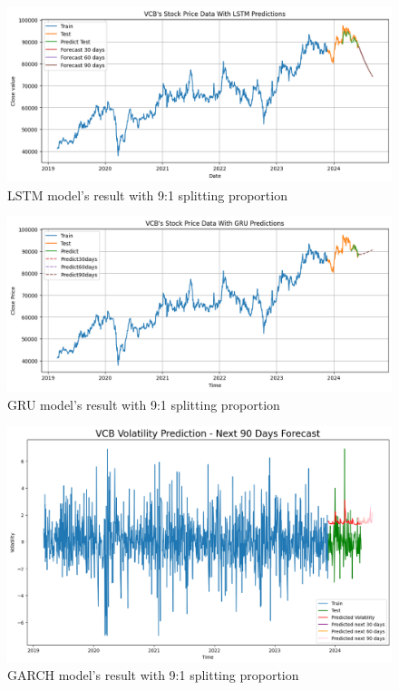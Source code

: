 \documentclass{ieeeojies}
\begin{document}
\begin{figure}[H]
  \centering
  \begin{minipage}{0.8\linewidth}
    \centering
    \includegraphics[width=\linewidth]{bibliography/VCB-LSTM-9-1.png}
    \caption{LSTM model's result with 9:1 splitting proportion}
    \label{fig9}
  \end{minipage}
\end{figure}
\begin{figure}[H]
  \centering
  \begin{minipage}{0.8\linewidth}
    \centering
    \includegraphics[width=\linewidth]{bibliography/VCB-GRU-9-1.png}
    \caption{GRU model's result with 9:1 splitting proportion}
    \label{fig10}
  \end{minipage}
\end{figure}
\begin{figure}[H]
  \centering
  \begin{minipage}{0.8\linewidth}
    \centering
    \includegraphics[width=\linewidth]{bibliography/VCB-GARCH-9-1.png}
    \caption{GARCH model's result with 9:1 splitting proportion}
    \label{fig11}
  \end{minipage}
\end{figure}
\end{document}
